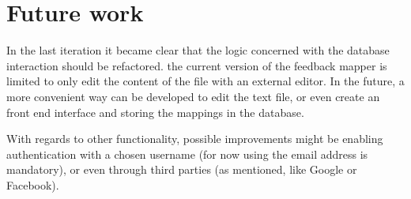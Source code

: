 \section{Future work}
In the last iteration it became clear that the logic concerned with the 
database interaction should be refactored. the current version of the feedback
mapper is limited to only edit the content of the file with an external editor.
In the future, a more convenient way can be developed to edit the text file, or
even create an front end interface and storing the mappings in the database.


With regards to other functionality, possible improvements might be enabling
authentication with a chosen username (for now using the email address is
mandatory), or even through third parties 
(as mentioned, like Google or Facebook).

